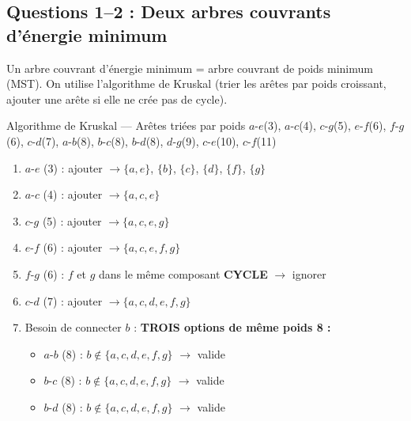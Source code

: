 \documentclass[12pt,a4paper]{article}
\begin{document}
\subsection{Questions 1--2 : Deux arbres couvrants d'énergie minimum}

\begin{methode}
Un arbre couvrant d'énergie minimum = arbre couvrant de poids minimum (MST). On utilise l'algorithme de Kruskal (trier les arêtes par poids croissant, ajouter une arête si elle ne crée pas de cycle).
\end{methode}

\begin{etape}{Algorithme de Kruskal --- Arêtes triées par poids}
$a$-$e$(3), $a$-$c$(4), $c$-$g$(5), $e$-$f$(6), $f$-$g$(6), $c$-$d$(7), $a$-$b$(8), $b$-$c$(8), $b$-$d$(8), $d$-$g$(9), $c$-$e$(10), $c$-$f$(11)

\begin{enumerate}
    \item $a$-$e$ (3) : ajouter $\to \{a,e\}$, $\{b\}$, $\{c\}$, $\{d\}$, $\{f\}$, $\{g\}$
    \item $a$-$c$ (4) : ajouter $\to \{a,c,e\}$
    \item $c$-$g$ (5) : ajouter $\to \{a,c,e,g\}$
    \item $e$-$f$ (6) : ajouter $\to \{a,c,e,f,g\}$
    \item $f$-$g$ (6) : $f$ et $g$ dans le même composant \textcolor{importantrouge}{\textbf{CYCLE}} $\to$ ignorer
    \item $c$-$d$ (7) : ajouter $\to \{a,c,d,e,f,g\}$
    \item Besoin de connecter $b$ : \textcolor{algoviolet}{\textbf{TROIS options de même poids 8 :}}
        \begin{itemize}
            \item $a$-$b$ (8) : $b \notin \{a,c,d,e,f,g\}$ $\to$ valide
            \item $b$-$c$ (8) : $b \notin \{a,c,d,e,f,g\}$ $\to$ valide
            \item $b$-$d$ (8) : $b \notin \{a,c,d,e,f,g\}$ $\to$ valide
        \end{itemize}
\end{enumerate}
\end{etape}
\end{document}
